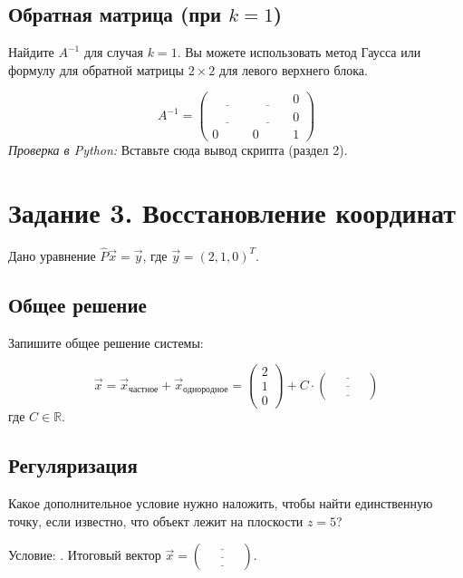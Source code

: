 \documentclass[a4paper,12pt]{article}
\newcommand{\blank}[1][5cm]{\underline{\hspace{#1}}}
\newenvironment{solutionbox}{
    \vspace{0.5em}
    \noindent\begin{tcolorbox}[colback=white!95!gray, colframe=gray!50!white, title=\textbf{Место для решения}, sharp corners]
}{
    \end{tcolorbox}
    \vspace{0.5em}
}
\begin{document}
\subsection{Обратная матрица (при $k=1$)}
Найдите $A^{-1}$ для случая $k=1$. Вы можете использовать метод Гаусса или формулу для обратной матрицы $2 \times 2$ для левого верхнего блока.

\begin{solutionbox}
\[
A^{-1} = \begin{pmatrix} 
\blank[1cm] & \blank[1cm] & 0 \\ 
\blank[1cm] & \blank[1cm] & 0 \\ 
0 & 0 & 1 
\end{pmatrix}
\]
\textit{Проверка в Python:} Вставьте сюда вывод скрипта (раздел 2).
\end{solutionbox}

\section{Задание 3. Восстановление координат}

Дано уравнение $\hat{P}\vec{x} = \vec{y}$, где $\vec{y} = (2, 1, 0)^T$.

\subsection{Общее решение}
Запишите общее решение системы:

\begin{solutionbox}
\[
\vec{x} = \vec{x}_{частное} + \vec{x}_{однородное} = \begin{pmatrix} 2 \\ 1 \\ 0 \end{pmatrix} + C \cdot \begin{pmatrix} \blank[1cm] \\ \blank[1cm] \\ \blank[1cm] \end{pmatrix}
\]
где $C \in \mathbb{R}$.
\end{solutionbox}

\subsection{Регуляризация}
Какое дополнительное условие нужно наложить, чтобы найти единственную точку, если известно, что объект лежит на плоскости $z = 5$?

\begin{solutionbox}
Условие: \blank[4cm].
Итоговый вектор $\vec{x} = \begin{pmatrix} \blank[1cm] \\ \blank[1cm] \\ \blank[1cm] \end{pmatrix}$.
\end{solutionbox}
\end{document}
